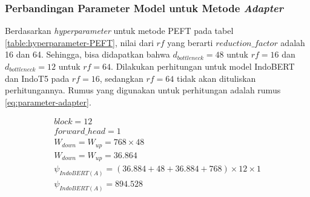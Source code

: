\begin{table}[h]
    \centering
    \caption{Parameter model IndoBERT dan IndoT5}
    \label{table:param-model}
\end{table}

\subsubsection{Perbandingan Parameter Model untuk Metode \textit{Adapter}}

Berdasarkan \textit{hyperparameter} untuk metode PEFT pada tabel \ref{table:hyperparameter-PEFT}, nilai dari $rf$ yang berarti $reduction\_factor$ adalah 16 dan 64. Sehingga, bisa didapatkan bahwa $d_{bottleneck}=48$ untuk $rf=16$ dan $d_{bottleneck}=12$ untuk $rf=64$. Dilakukan perhitungan untuk model IndoBERT dan IndoT5 pada $rf=16$, sedangkan $rf=64$ tidak akan dituliskan perhitungannya. Rumus yang digunakan untuk perhitungan adalah rumus \ref{eq:parameter-adapter}.

\begin{equation}
    \begin{aligned}
        block = 12 \\ 
        forward\_head = 1 \\
        W_{down} = W_{up} = 768 \times 48 \\
        W_{down} = W_{up} = 36.864 \\
        \psi_{IndoBERT(A)} = (36.884 + 48 + 36.884 + 768) \times 12 \times 1 \\
        \psi_{IndoBERT(A)} = 894.528 \\
    \end{aligned}
    \label{eq:calc-param-adapter-bert}
\end{equation}

